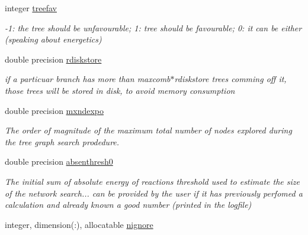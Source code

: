 \begin{DoxyCompactItemize}
integer \mbox{\hyperlink{structglobaldata_1_1graphpar_ad9b8844b41841dfc53b0c5f541dbd8e6}{treefav}}
\begin{DoxyCompactList}\small\item\em -\/1\+: the tree should be unfavourable; 1\+: tree should be favourable; 0\+: it can be either (speaking about energetics) \end{DoxyCompactList}\item 
\mbox{\label{structglobaldata_1_1graphpar_ac00dee4f8afb16f330791c8525444c39}} 
double precision \mbox{\hyperlink{structglobaldata_1_1graphpar_ac00dee4f8afb16f330791c8525444c39}{rdiskstore}}
\begin{DoxyCompactList}\small\item\em if a particuar branch has more than maxcomb$\ast$rdiskstore trees comming off it, those trees will be stored in disk, to avoid memory consumption \end{DoxyCompactList}\item 
\mbox{\label{structglobaldata_1_1graphpar_a2cb22362561cf109e66dd76e3af245a5}} 
double precision \mbox{\hyperlink{structglobaldata_1_1graphpar_a2cb22362561cf109e66dd76e3af245a5}{mxndexpo}}
\begin{DoxyCompactList}\small\item\em The order of magnitude of the maximum total number of nodes explored during the tree graph search prodedure. \end{DoxyCompactList}\item 
\mbox{\label{structglobaldata_1_1graphpar_ace153ec8e235706b4a713ef6b50f64a6}} 
double precision \mbox{\hyperlink{structglobaldata_1_1graphpar_ace153ec8e235706b4a713ef6b50f64a6}{absenthresh0}}
\begin{DoxyCompactList}\small\item\em The initial sum of absolute energy of reactions threshold used to estimate the size of the network search... can be provided by the user if it has previously perfomed a calculation and already known a good number (printed in the logfile) \end{DoxyCompactList}\item 
\mbox{\label{structglobaldata_1_1graphpar_a0d37531e15474671119a2d3a5be79a17}} 
integer, dimension(\+:), allocatable \mbox{\hyperlink{structglobaldata_1_1graphpar_a0d37531e15474671119a2d3a5be79a17}{nignore}}

\end{DoxyCompactItemize}
